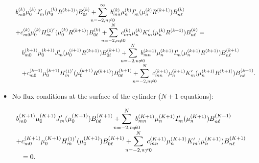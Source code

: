 \documentclass{jfm}
\begin{document}
\begin{itemize}
\begin{eqnarray}
\begin{array}{l}
\displaystyle b_{m0}^{(k)}\mu^{(k)}_0J'_m(\mu^{(k)}_0 R^{(k+1)})B_{0\ell}^{(k)}+ \hspace{-4mm} \sum_{n=-2,n\ne 0}^{\infty}\hspace{-3mm}b^{(k)}_{mn}\mu^{(k)}_n I'_m(\mu^{(k)}_n R^{(k+1)}) B_{n\ell}^{(k)} \\
\displaystyle +c_{m0}^{(k)}\mu^{(k)}_0H_m^{(1)'}(\mu^{(k)}_0 R^{(k+1)})B_{0\ell}^{(k)} + \hspace{-4mm} \sum_{n=-2,n\ne 0}^{N}\hspace{-3mm}c^{(k)}_{mn}\mu^{(k)}_n K'_m(\mu^{(k)}_n R^{(k+1)}) B_{n\ell}^{(k)}=\\
\displaystyle \quad  b_{m0}^{(k+1)}\mu^{(k+1)}_0J'_m(\mu^{(i+1)}_0 R^{(k+1)})B_{0\ell}^{(k+1)}+\hspace{-4mm} \sum_{n=-2,n\ne 0}^{N}\hspace{-3mm} b^{(k+1)}_{mn}\mu^{(k+1)}_n I'_m(\mu^{(k+1)}_n R^{(k+1)}) B_{n\ell}^{(k+1)} \\
\displaystyle \quad +c_{m0}^{(k+1)}\mu^{(k+1)}_0H_m^{(1)'}(\mu^{(k+1)}_0 R^{(k+1)})B_{0\ell}^{(k+1)} + \hspace{-4mm} \sum_{n=-2,n\ne 0}^{N}\hspace{-3mm}  c^{(k+1)}_{mn}\mu^{(k+1)}_n K'_m(\mu^{(k+1)}_n R^{(k+1)}) B_{n\ell}^{(k+1)}.
\end{array}
\end{eqnarray}


  \item 
No flux conditions at the surface of the cylinder ($N+1$ equations):

\begin{eqnarray}
\begin{array}{l}
\displaystyle b_{m0}^{(K+1)}\mu^{(K+1)}_0J'_m(\mu^{(K+1)}_0 )B_{0\ell}^{(K+1)}+ \hspace{-4mm} \sum_{n=-2,n\ne 0}^{N}\hspace{-3mm}b^{(K+1)}_{mn}\mu^{(K+1)}_n I'_m(\mu^{(K+1)}_n) B_{n\ell}^{(K+1)} \\
\displaystyle +c_{m0}^{(K+1)}\mu^{(K+1)}_0H_m^{(1)'}(\mu^{(K+1)}_0 )B_{0\ell}^{(K+1)} + \hspace{-4mm} \sum_{n=-2,n\ne 0}^{N}\hspace{-3mm}c^{(K+1)}_{mn}\mu^{(K+1)}_n K'_m(\mu^{(K+1)}_n ) B_{n\ell}^{(K+1)}\\
\displaystyle \quad =0.
\end{array}
\end{eqnarray}



\end{itemize}
\end{document}
